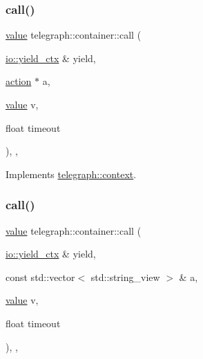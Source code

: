 \subsubsection{\texorpdfstring{call()}{call()}\hspace{0.1cm}{\footnotesize\ttfamily [1/2]}}
{\footnotesize\ttfamily \hyperlink{classtelegraph_1_1value}{value} telegraph\+::container\+::call (\begin{DoxyParamCaption}\item[{\hyperlink{structboost_1_1asio_1_1yield__ctx}{io\+::yield\+\_\+ctx} \&}]{yield,  }\item[{\hyperlink{classtelegraph_1_1action}{action} $\ast$}]{a,  }\item[{\hyperlink{classtelegraph_1_1value}{value}}]{v,  }\item[{float}]{timeout }\end{DoxyParamCaption})\hspace{0.3cm}{\ttfamily [inline]}, {\ttfamily [override]}, {\ttfamily [virtual]}}



Implements \hyperlink{classtelegraph_1_1context_a72da471eb635e5505b10d2f1103359ac}{telegraph\+::context}.

\mbox{\label{classtelegraph_1_1container_a83d26f574b7f75655be9752147e30dce}} 
\subsubsection{\texorpdfstring{call()}{call()}\hspace{0.1cm}{\footnotesize\ttfamily [2/2]}}
{\footnotesize\ttfamily \hyperlink{classtelegraph_1_1value}{value} telegraph\+::container\+::call (\begin{DoxyParamCaption}\item[{\hyperlink{structboost_1_1asio_1_1yield__ctx}{io\+::yield\+\_\+ctx} \&}]{yield,  }\item[{const std\+::vector$<$ std\+::string\+\_\+view $>$ \&}]{a,  }\item[{\hyperlink{classtelegraph_1_1value}{value}}]{v,  }\item[{float}]{timeout }\end{DoxyParamCaption})\hspace{0.3cm}{\ttfamily [inline]}, {\ttfamily [override]}, {\ttfamily [virtual]}}



